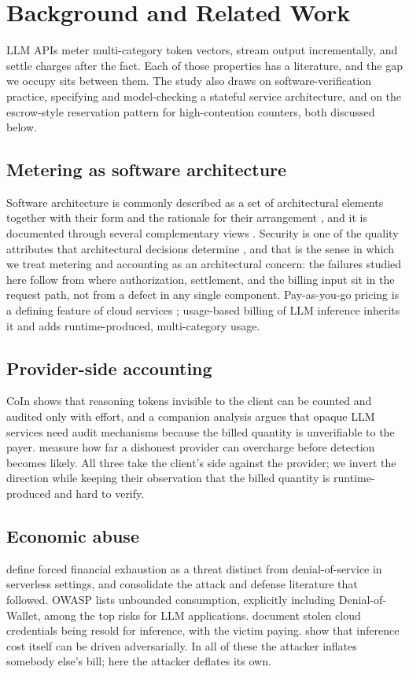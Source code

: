 \documentclass[preprint,3p,authoryear,12pt]{elsarticle}
\begin{document}
\section{Background and Related Work}
\label{sec:related}
LLM APIs meter multi-category token vectors, stream output incrementally, and settle
charges after the fact. Each of those properties has a literature, and the gap we occupy
sits between them. The study also draws on software-verification practice, specifying and
model-checking a stateful service architecture, and on the escrow-style reservation
pattern for high-contention counters, both discussed below.

\subsection{Metering as software architecture}
Software architecture is commonly described as a set of architectural elements together
with their form and the rationale for their arrangement \citep{perrywolf}, and it is
documented through several complementary views \citep{kruchten}. Security is one of the
quality attributes that architectural decisions determine \citep{bass}, and that is the
sense in which we treat metering and accounting as an architectural concern: the
failures studied here follow from where authorization, settlement, and the billing input
sit in the request path, not from a defect in any single component. Pay-as-you-go pricing
is a defining feature of cloud services \citep{armbrust}; usage-based billing of LLM
inference inherits it and adds runtime-produced, multi-category usage.

\subsection{Provider-side accounting}
CoIn \citep{coin} shows that reasoning tokens invisible to the client can be counted and
audited only with effort, and a companion analysis \citep{invisible} argues that opaque
LLM services need audit mechanisms because the billed quantity is unverifiable to the
payer. \citet{tokeninflation} measure how far a dishonest provider can overcharge before
detection becomes likely. All three take the client's side against the provider; we
invert the direction while keeping their observation that the billed quantity is
runtime-produced and hard to verify.

\subsection{Economic abuse}
\citet{dow} define forced financial exhaustion as a threat distinct from
denial-of-service in serverless settings, and \citet{dowreview} consolidate the attack
and defense literature that followed. OWASP \citep{owasp} lists unbounded consumption,
explicitly including Denial-of-Wallet, among the top risks for LLM applications.
\citet{llmjacking} document stolen cloud credentials being resold for inference, with the
victim paying. \citet{sponge} show that inference cost itself can be driven
adversarially. In all of these the attacker inflates somebody else's bill; here the
attacker deflates its own.
\end{document}
